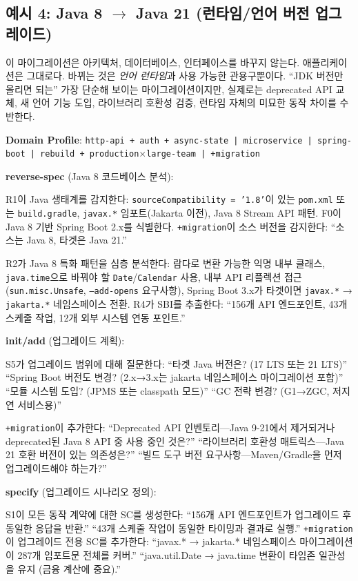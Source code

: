 \documentclass[11pt,a4paper,openright,twoside]{report}
\begin{document}
\subsection{예시 4: Java 8 $\to$ Java 21 (런타임/언어 버전 업그레이드)}

이 마이그레이션은 아키텍처, 데이터베이스, 인터페이스를 바꾸지 않는다. 애플리케이션은 그대로다. 바뀌는 것은 \emph{언어 런타임}과 사용 가능한 관용구뿐이다. ``JDK 버전만 올리면 되는'' 가장 단순해 보이는 마이그레이션이지만, 실제로는 deprecated API 교체, 새 언어 기능 도입, 라이브러리 호환성 검증, 런타임 자체의 미묘한 동작 차이를 수반한다.

\textbf{Domain Profile}: \texttt{http-api + auth + async-state | microservice | spring-boot | rebuild + production$\times$large-team | +migration}

\textbf{reverse-spec} (Java 8 코드베이스 분석):

R1이 Java 생태계를 감지한다: \texttt{sourceCompatibility = '1.8'}이 있는 \texttt{pom.xml} 또는 \texttt{build.gradle}, \texttt{javax.*} 임포트(Jakarta 이전), Java 8 Stream API 패턴. F0이 Java 8 기반 Spring Boot 2.x를 식별한다. \texttt{+migration}이 소스 버전을 감지한다: ``소스는 Java 8, 타겟은 Java 21.''

R2가 Java 8 특화 패턴을 심층 분석한다: 람다로 변환 가능한 익명 내부 클래스, \texttt{java.time}으로 바꿔야 할 \texttt{Date}/\texttt{Calendar} 사용, 내부 API 리플렉션 접근(\texttt{sun.misc.Unsafe}, \texttt{--add-opens} 요구사항), Spring Boot 3.x가 타겟이면 \texttt{javax.*} → \texttt{jakarta.*} 네임스페이스 전환. R4가 SBI를 추출한다: ``156개 API 엔드포인트, 43개 스케줄 작업, 12개 외부 시스템 연동 포인트.''

\textbf{init/add} (업그레이드 계획):

S5가 업그레이드 범위에 대해 질문한다: ``타겟 Java 버전은? (17 LTS 또는 21 LTS)'' ``Spring Boot 버전도 변경? (2.x→3.x는 jakarta 네임스페이스 마이그레이션 포함)'' ``모듈 시스템 도입? (JPMS 또는 classpath 모드)'' ``GC 전략 변경? (G1→ZGC, 저지연 서비스용)''

\texttt{+migration}이 추가한다: ``Deprecated API 인벤토리---Java 9-21에서 제거되거나 deprecated된 Java 8 API 중 사용 중인 것은?'' ``라이브러리 호환성 매트릭스---Java 21 호환 버전이 있는 의존성은?'' ``빌드 도구 버전 요구사항---Maven/Gradle을 먼저 업그레이드해야 하는가?''

\textbf{specify} (업그레이드 시나리오 정의):

S1이 모든 동작 계약에 대한 SC를 생성한다: ``156개 API 엔드포인트가 업그레이드 후 동일한 응답을 반환.'' ``43개 스케줄 작업이 동일한 타이밍과 결과로 실행.'' \texttt{+migration}이 업그레이드 전용 SC를 추가한다: ``javax.* → jakarta.* 네임스페이스 마이그레이션이 287개 임포트문 전체를 커버.'' ``java.util.Date → java.time 변환이 타임존 일관성을 유지 (금융 계산에 중요).''
\end{document}
